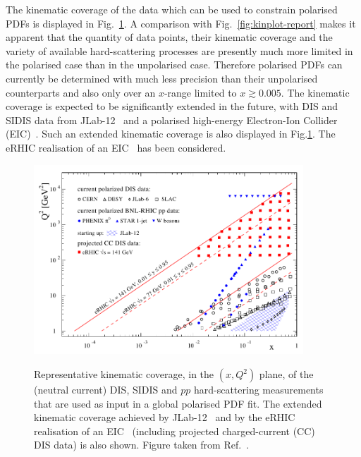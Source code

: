 The kinematic coverage of the data which can be used to constrain polarised 
PDFs is displayed in Fig.~\ref{fig:kinEIC}.
%
A comparison with Fig.~\ref{fig:kinplot-report} makes it apparent that the
quantity of data points, their kinematic coverage and the variety of 
available hard-scattering processes are presently much more limited in the polarised case
than in the unpolarised case.
%
Therefore polarised PDFs can currently be determined with much less 
precision than their unpolarised counterparts and also only over an $x$-range limited
to $x\gtrsim 0.005$.
%
The kinematic coverage is expected to be significantly extended in the future,
with DIS and SIDIS data from JLab-12~\cite{Dudek:2012vr} and a polarised 
high-energy Electron-Ion Collider (EIC)~\cite{Accardi:2012qut}.
%
Such an extended kinematic coverage is also displayed in Fig.\ref{fig:kinEIC}.
%
The eRHIC realisation of an EIC~\cite{Aschenauer:2014cki} has been considered.

\begin{figure}[!t]
\centering
\includegraphics[width=0.9\textwidth]{plots/kinEIC}\\
\caption{\small Representative kinematic coverage, in the $(x,Q^2)$ plane,
of the (neutral current) DIS, SIDIS and $pp$ hard-scattering measurements 
that are used as input in a global polarised PDF fit.
%
The extended kinematic coverage achieved by 
JLab-12~\cite{Dudek:2012vr} and by the eRHIC~\cite{Aschenauer:2014cki} 
realisation of an EIC~\cite{Accardi:2012qut}
(including projected charged-current (CC) DIS data) is also shown.
%
Figure taken from Ref.~\cite{Aschenauer:2014cki}.}
\label{fig:kinEIC}
\end{figure}

